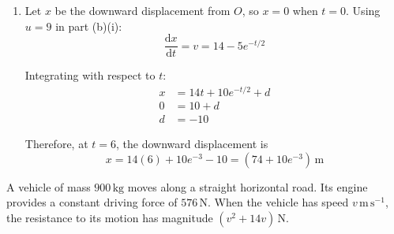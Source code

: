 \documentclass[leqno]{article}
\begin{document}
\begin{enumerate}[
  label=\textbf{\arabic*.},
  leftmargin=*,
  topsep=0pt,
  partopsep=0pt,
  parsep=0pt
]
\begin{djsSolution}
\begin{enumerate}[label=\textbf{(\alph*)}, start=1]
\begin{enumerate}[label=(\roman*), start=1]
Using \(v=u\) when \(t=0\) gives \(c=\ln|u-14|\). Hence
\begin{align*}
\ln|v-14|-\ln|u-14|&=-\dfrac t2\\
|v-14|&=|u-14|e^{-t/2}
\end{align*}

The right-hand side is non-zero for finite \(t\), so \(v-14\) cannot change sign. It therefore has the same sign as its initial value \(u-14\), giving
\[
v-14=(u-14)e^{-t/2}
\]

If \(u=14\), the differential equation gives the constant solution \(v=14\). Thus, for every \(u>0\), the solution is
\[
v=14+(u-14)e^{-t/2}
\]

\item Since \(e^{-t/2}\) decreases from \(1\) towards \(0\):
\begin{itemize}
\item If \(0<u<14\), the speed increases from \(u\) towards \(14\,\mathrm{m\,s^{-1}}\).
\item If \(u=14\), the speed remains constant at \(14\,\mathrm{m\,s^{-1}}\).
\item If \(u>14\), the speed decreases from \(u\) towards \(14\,\mathrm{m\,s^{-1}}\).
\end{itemize}
In all three cases, the limiting speed is \(14\,\mathrm{m\,s^{-1}}\).
\end{enumerate}

\item Let \(x\) be the downward displacement from \(O\), so \(x=0\) when \(t=0\). Using \(u=9\) in part (b)(i):
\[
\dfrac{\mathrm{d}x}{\mathrm{d}t}=v=14-5e^{-t/2}
\]

Integrating with respect to \(t\):
\begin{align*}
x&=14t+10e^{-t/2}+d\\
0&=10+d\\
d&=-10
\end{align*}

Therefore, at \(t=6\), the downward displacement is
\[
x=14(6)+10e^{-3}-10=\left(74+10e^{-3}\right)\,\mathrm{m}
\]
\end{enumerate}
\end{djsSolution}

\newpage

\questionitem

A vehicle of mass $900\,\mathrm{kg}$ moves along a straight horizontal road. Its engine provides a constant driving force of $576\,\mathrm{N}$. When the vehicle has speed $v\,\mathrm{m\,s^{-1}}$, the resistance to its motion has magnitude $(v^2+14v)\,\mathrm{N}$. \\


\end{enumerate}
\end{document}
